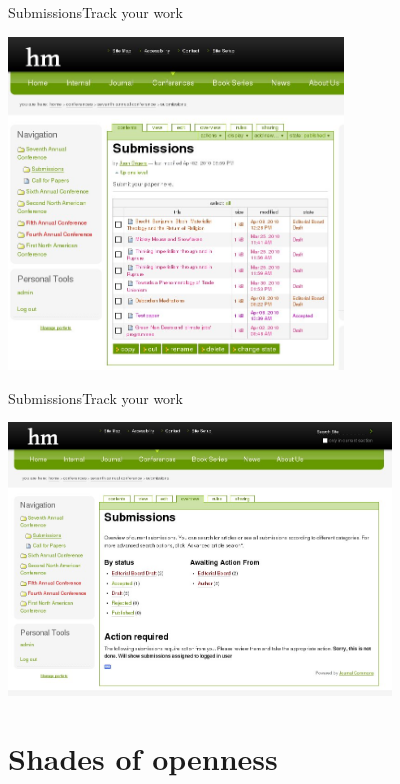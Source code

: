 \begin{frame}{Submissions}{Track your work}
\begin{center}
\includegraphics[width=3.5in]{3-conference-ListAllSubmissions.jpg}
\end{center}
\end{frame} 

\begin{frame}{Submissions}{Track your work}
\begin{center}
\includegraphics[width=4in]{4-conference-SubmissionsCategoriesAndActions.jpg}
\end{center}
\end{frame} 

\section{Shades of openness}

